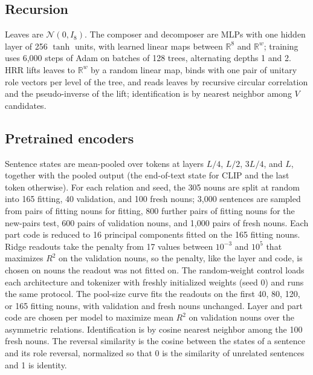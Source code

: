 \documentclass[10pt]{article}
\theoremstyle{plain}
\theoremstyle{remark}
\newcommand{\R}{\mathbb{R}}
\begin{document}
\subsection{Recursion}
Leaves are $\mathcal{N}(0, I_8)$. The composer and decomposer are MLPs with one hidden layer of 256 $\tanh$ units, with learned linear maps between $\R^8$ and $\R^w$; training uses 6{,}000 steps of Adam on batches of 128 trees, alternating depths 1 and 2. HRR lifts leaves to $\R^w$ by a random linear map, binds with one pair of unitary role vectors per level of the tree, and reads leaves by recursive circular correlation and the pseudo-inverse of the lift; identification is by nearest neighbor among $V$ candidates.

\subsection{Pretrained encoders}
Sentence states are mean-pooled over tokens at layers $L/4$, $L/2$, $3L/4$, and $L$, together with the pooled output (the end-of-text state for CLIP and the last token otherwise). For each relation and seed, the 305 nouns are split at random into 165 fitting, 40 validation, and 100 fresh nouns; 3{,}000 sentences are sampled from pairs of fitting nouns for fitting, 800 further pairs of fitting nouns for the new-pairs test, 600 pairs of validation nouns, and 1{,}000 pairs of fresh nouns. Each part code is reduced to 16 principal components fitted on the 165 fitting nouns. Ridge readouts take the penalty from 17 values between $10^{-3}$ and $10^{5}$ that maximizes $R^2$ on the validation nouns, so the penalty, like the layer and code, is chosen on nouns the readout was not fitted on. The random-weight control loads each architecture and tokenizer with freshly initialized weights (seed 0) and runs the same protocol. The pool-size curve fits the readouts on the first 40, 80, 120, or 165 fitting nouns, with validation and fresh nouns unchanged. Layer and part code are chosen per model to maximize mean $R^2$ on validation nouns over the asymmetric relations. Identification is by cosine nearest neighbor among the 100 fresh nouns. The reversal similarity is the cosine between the states of a sentence and its role reversal, normalized so that 0 is the similarity of unrelated sentences and 1 is identity.
\end{document}
